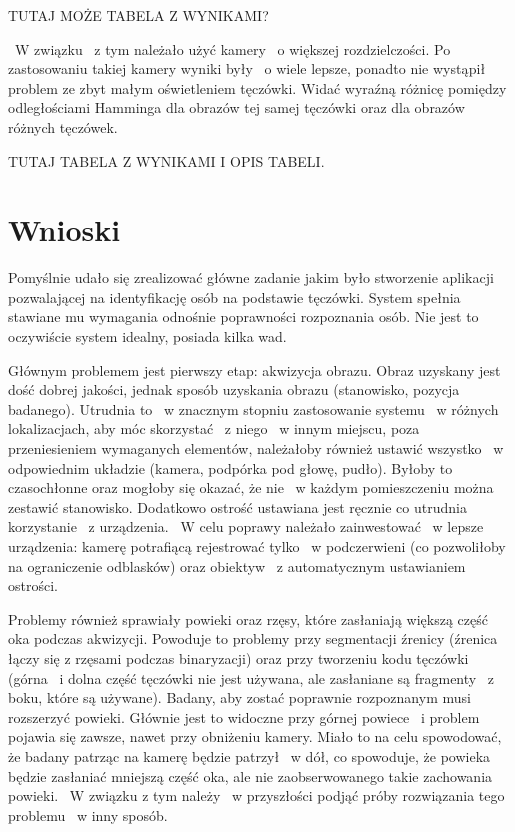 TUTAJ MOŻE TABELA Z WYNIKAMI?

~W związku ~z tym należało użyć kamery ~o większej rozdzielczości. Po zastosowaniu takiej kamery wyniki były ~o wiele lepsze, ponadto nie wystąpił problem ze zbyt małym oświetleniem tęczówki. Widać wyraźną różnicę pomiędzy odległościami Hamminga dla obrazów tej samej tęczówki oraz dla obrazów różnych tęczówek.

TUTAJ TABELA Z WYNIKAMI I OPIS TABELI.

\section{Wnioski}
\label{sec:wnioski}

Pomyślnie udało się zrealizować główne zadanie jakim było stworzenie aplikacji pozwalającej na identyfikację osób na podstawie tęczówki. System spełnia stawiane mu wymagania odnośnie poprawności rozpoznania osób. Nie jest to oczywiście system idealny, posiada kilka wad.

Głównym problemem jest pierwszy etap: akwizycja obrazu. Obraz uzyskany jest dość dobrej jakości, jednak sposób uzyskania obrazu (stanowisko, pozycja badanego). Utrudnia to ~w znacznym stopniu zastosowanie systemu ~w różnych lokalizacjach, aby móc skorzystać ~z niego ~w innym miejscu, poza przeniesieniem wymaganych elementów, należałoby również ustawić wszystko ~w odpowiednim układzie (kamera, podpórka pod głowę, pudło). Byłoby to czasochłonne oraz mogłoby się okazać, że nie ~w każdym pomieszczeniu można zestawić stanowisko. Dodatkowo ostrość ustawiana jest ręcznie co utrudnia korzystanie ~z urządzenia. ~W celu poprawy należało zainwestować ~w lepsze urządzenia: kamerę potrafiącą rejestrować tylko ~w podczerwieni (co pozwoliłoby na ograniczenie odblasków) oraz obiektyw ~z automatycznym ustawianiem ostrości.

Problemy również sprawiały powieki oraz rzęsy, które zasłaniają większą część oka podczas akwizycji. Powoduje to problemy przy segmentacji źrenicy (źrenica łączy się z rzęsami podczas binaryzacji) oraz przy tworzeniu kodu tęczówki (górna ~i dolna część tęczówki nie jest używana, ale zasłaniane są fragmenty ~z boku, które są używane). Badany, aby zostać poprawnie rozpoznanym musi rozszerzyć powieki. Głównie jest to widoczne przy górnej powiece ~i problem pojawia się zawsze, nawet przy obniżeniu kamery. Miało to na celu spowodować, że badany patrząc na kamerę będzie patrzył ~w dół, co spowoduje, że powieka będzie zasłaniać mniejszą część oka, ale nie zaobserwowanego takie zachowania powieki. ~W związku z tym należy ~w przyszłości podjąć próby rozwiązania tego problemu ~w inny sposób.

